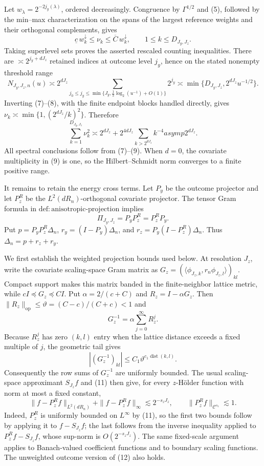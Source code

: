 Let \(w_\lambda=2^{-2j_y(\lambda)}\), ordered decreasingly. Congruence by \(\Gamma^{1/2}\) and (5), followed by the min--max characterization on the spans of the largest reference weights and their orthogonal complements, gives
\[
\underline c\,w_k^\downarrow\le\nu_k\le\overline C\,w_k^\downarrow,
\qquad 1\le k\le D_{J_y,J_z}.                                   \tag{7}
\]
Taking superlevel sets proves the asserted rescaled counting inequalities. There are \(\asymp2^{j_y+dJ_z}\) retained indices at outcome level \(j_y\), hence on the stated nonempty threshold range
\[
N_{J_y,J_z,n}(u)
\asymp2^{dJ_z}\sum_{j_0\le j_y\le\min\{J_y,\frac12\log_2(u^{-1})+O(1)\}}2^{j_y}
\asymp\min\{D_{J_y,J_z},2^{dJ_z}u^{-1/2}\}.                    \tag{8}
\]
Inverting (7)--(8), with the finite endpoint blocks handled directly, gives \(\nu_k\asymp\min\{1,(2^{dJ_z}/k)^2\}\). Therefore
\[
\sum_{k=1}^{D_{J_y,J_z}}\nu_k^2
\asymp2^{dJ_z}+2^{4dJ_z}\sum_{k>2^{dJ_z}}k^{-4}asymp2^{dJ_z}. \tag{9}
\]
All spectral conclusions follow from (7)--(9). When \(d=0\), the covariate multiplicity in (9) is one, so the Hilbert--Schmidt norm converges to a finite positive range.

It remains to retain the energy cross terms. Let \(P_y\) be the outcome projector and let \(P_z^R\) be the \(L^2(dR_n)\)-orthogonal covariate projector. The tensor Gram formula in \(\mathrm{def{:}anisotropic\text{-}projection}\) implies
\[
\Pi_{J_y,J_z}=P_yP_z^R=P_z^RP_y.                                \tag{10}
\]
Put \(p=P_yP_z^R\Delta_n\), \(r_y=(I-P_y)\Delta_n\), and \(r_z=P_y(I-P_z^R)\Delta_n\). Thus \(\Delta_n=p+r_z+r_y\).

We first establish the weighted projection bounds used below. At resolution \(J_z\), write the covariate scaling-space Gram matrix as \(G_z=(\langle\phi_{J_z,k},r_n\phi_{J_z,l}\rangle)_{kl}\). Compact support makes this matrix banded in the finite-neighbor lattice metric, while \(cI\preceq G_z\preceq CI\). Put \(\alpha=2/(c+C)\) and \(R_z=I-\alpha G_z\). Then \(\|R_z\|_{\mathrm{op}}\le\vartheta=(C-c)/(C+c)<1\) and
\[
G_z^{-1}=\alpha\sum_{j=0}^{\infty}R_z^j.
\]
Because \(R_z^j\) has zero \((k,l)\) entry when the lattice distance exceeds a fixed multiple of \(j\), the geometric tail gives
\[
|(G_z^{-1})_{kl}|\le C_1\vartheta^{c_1\operatorname{dist}(k,l)}. \tag{11}
\]
Consequently the row sums of \(G_z^{-1}\) are uniformly bounded. The usual scaling-space approximant \(S_{J_z}f\) and (11) then give, for every \(z\)-H\"older function with norm at most a fixed constant,
\[
\|f-P_z^Rf\|_{L^2(dR_n)}+\|f-P_z^Rf\|_\infty\lesssim2^{-s_zJ_z},
\qquad \|P_z^Rf\|_{\mathcal C^{s_z}}\lesssim1.                 \tag{12}
\]
Indeed, \(P_z^R\) is uniformly bounded on \(L^\infty\) by (11), so the first two bounds follow by applying it to \(f-S_{J_z}f\); the last follows from the inverse inequality applied to \(P_z^Rf-S_{J_z}f\), whose sup-norm is \(O(2^{-s_zJ_z})\). The same fixed-scale argument applies to Banach-valued coefficient functions and to boundary scaling functions. The unweighted outcome version of (12) also holds.

